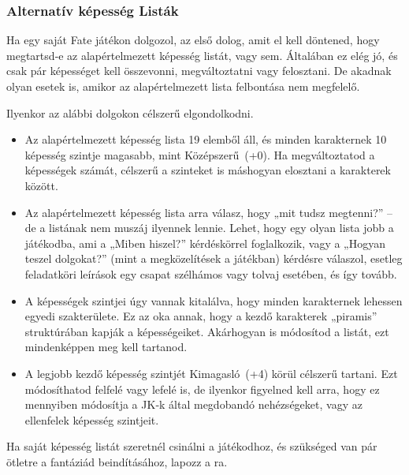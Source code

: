 \subsubsection{Alternatív képesség Listák}

Ha egy saját Fate játékon dolgozol, az első dolog, amit el kell döntened, hogy megtartsd‑e az alapértelmezett képesség listát, vagy sem. Általában ez elég jó, és csak pár képességet kell összevonni, megváltoztatni vagy felosztani. De akadnak olyan esetek is, amikor az alapértelmezett lista felbontása nem megfelelő. 

Ilyenkor az alábbi dolgokon célszerű elgondolkodni.

\begin{itemize}
    \item Az alapértelmezett képesség lista 19 elemből áll, és minden karakternek 10 képesség szintje magasabb, mint Középszerű~(+0). Ha megváltoztatod a képességek számát, célszerű a szinteket is máshogyan elosztani a karakterek között.
    \item Az alapértelmezett képesség lista arra válasz, hogy „mit tudsz megtenni?” – de a listának nem muszáj ilyennek lennie. Lehet, hogy egy olyan lista jobb a játékodba, ami a „Miben hiszel?” kérdéskörrel foglalkozik, vagy a „Hogyan teszel dolgokat?” (mint a megközelítések a  játékban) kérdésre válaszol, esetleg feladatköri leírások egy csapat szélhámos vagy tolvaj esetében, és így tovább.
    \item A képességek szintjei úgy vannak kitalálva, hogy minden karakternek lehessen egyedi szakterülete. Ez az oka annak, hogy a kezdő karakterek „piramis” struktúrában kapják a képességeiket. Akárhogyan is módosítod a listát, ezt mindenképpen meg kell tartanod.
    \item A legjobb kezdő képesség szintjét Kimagasló~(+4) körül célszerű tartani. Ezt módosíthatod felfelé vagy lefelé is, de ilyenkor figyelned kell arra, hogy ez mennyiben módosítja a JK‑k által megdobandó nehézségeket, vagy az ellenfelek képesség szintjeit.
\end{itemize}


Ha saját képesség listát szeretnél csinálni a játékodhoz, és szükséged van pár ötletre a fantáziád beindításához, lapozz a ra.
